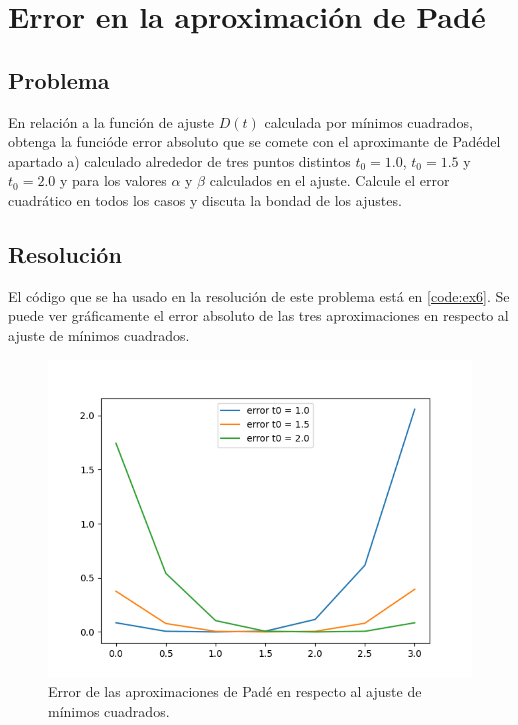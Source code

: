 \section{Error en la aproximación de Padé}

\subsection{Problema}
En relación a la función de ajuste $D(t)$ calculada por mínimos cuadrados, obtenga la funcióde error absoluto que se comete con el aproximante de Padédel apartado a) calculado alrededor de tres puntos distintos $t_0 = 1.0$, $t_0 = 1.5$ y $t_0 = 2.0$ y para los valores $\alpha$ y $\beta$ calculados en el ajuste. Calcule el error cuadrático en todos los casos y discuta la bondad de los ajustes.


\subsection{Resolución}

El código que se ha usado en la resolución de este problema está en \ref{code:ex6}. Se puede ver gráficamente el error absoluto de las tres aproximaciones en respecto al ajuste de mínimos cuadrados.

\begin{figure}[H]
	\includegraphics[width=\linewidth]{figures/error_abs_pade.png}
	\caption{Error de las aproximaciones de Padé en respecto al ajuste de mínimos cuadrados.}
	\label{fig:error_abs_pade}
\end{figure}

\newpage 

